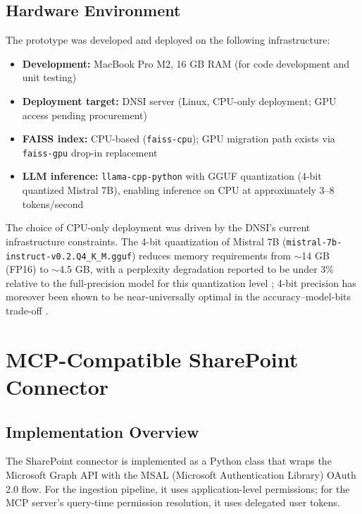 \subsection{Hardware Environment}

The prototype was developed and deployed on the following infrastructure:

\begin{itemize}
  \item \textbf{Development:} MacBook Pro M2, 16 GB RAM (for code development and unit testing)
  \item \textbf{Deployment target:} DNSI server (Linux, CPU-only deployment; GPU access pending procurement)
  \item \textbf{FAISS index:} CPU-based (\texttt{faiss-cpu}); GPU migration path exists via \texttt{faiss-gpu} drop-in replacement
  \item \textbf{LLM inference:} \texttt{llama-cpp-python} with GGUF quantization (4-bit quantized Mistral 7B), enabling inference on CPU at approximately 3--8 tokens/second
\end{itemize}

The choice of CPU-only deployment was driven by the DNSI's current infrastructure constraints. The 4-bit quantization of Mistral 7B (\texttt{mistral-7b-instruct-v0.2.Q4\_K\_M.gguf}) reduces memory requirements from $\sim$14 GB (FP16) to $\sim$4.5 GB, with a perplexity degradation reported to be under 3\% relative to the full-precision model for this quantization level \citep{GerganovLlamaCpp2023}; 4-bit precision has moreover been shown to be near-universally optimal in the accuracy--model-bits trade-off \citep{Dettmers2023}.

\section{MCP-Compatible SharePoint Connector}
\label{sec:impl-connector}

\subsection{Implementation Overview}

The SharePoint connector is implemented as a Python class that wraps the Microsoft Graph API with the MSAL (Microsoft Authentication Library) OAuth 2.0 flow. For the ingestion pipeline, it uses application-level permissions; for the MCP server's query-time permission resolution, it uses delegated user tokens.

